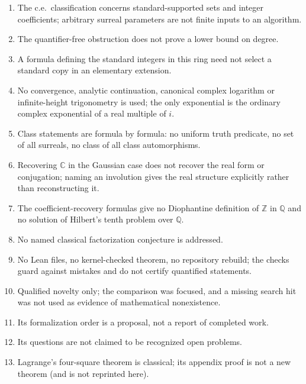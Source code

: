 \documentclass[11pt,oneside]{article}
\numberwithin{equation}{section}
\theoremstyle{definition}
\theoremstyle{remark}
\newcommand{\No}{\mathbf{No}}
\newcommand{\Z}{\mathbb Z}
\newcommand{\Q}{\mathbb Q}
\newcommand{\R}{\mathbb R}
\newcommand{\C}{\mathbb C}
\begin{document}
\begin{enumerate}[leftmargin=*,itemsep=1pt]
the real closedness of $\No$; no common denominator for a proper class is
asserted; pointwise fixation uses the density of $\Q$ in $\R$, and a general
ordered coefficient field can have nontrivial automorphisms.
\item The c.e.\ classification concerns standard-supported sets and integer
coefficients; arbitrary surreal parameters are not finite inputs to an
algorithm.
\item The quantifier-free obstruction does not prove a lower bound on degree.
\item A formula defining the standard integers in this ring need not select a
standard copy in an elementary extension.
\item No convergence, analytic continuation, canonical complex logarithm or
infinite-height trigonometry is used; the only exponential is the ordinary
complex exponential of a real multiple of $i$.
\item Class statements are formula by formula: no uniform truth predicate, no
set of all surreals, no class of all class automorphisms.
\item Recovering $\C$ in the Gaussian case does not recover the real form or
conjugation; naming an involution gives the real structure explicitly rather
than reconstructing it.
\item The coefficient-recovery formulas give no Diophantine definition of $\Z$
in $\Q$ and no solution of Hilbert's tenth problem over $\Q$.
\item No named classical factorization conjecture is addressed.
\item No Lean files, no kernel-checked theorem, no repository rebuild; the
checks guard against mistakes and do not certify quantified statements.
\item Qualified novelty only; the comparison was focused, and a missing search
hit was not used as evidence of mathematical nonexistence.
\item Its formalization order is a proposal, not a report of completed work.
\item Its questions are not claimed to be recognized open problems.
\item Lagrange's four-square theorem is classical; its appendix proof is not a
new theorem (and is not reprinted here).
\end{enumerate}
\end{document}

